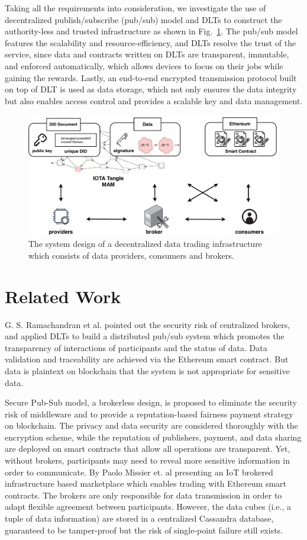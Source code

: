 \documentclass[10pt, conference, compsocconf]{IEEEtran}
\begin{document}
Taking all the requirements into consideration, we investigate the use of decentralized publish/subscribe (pub/sub) model and DLTs to construct the authority-less and trusted infrastructure as shown in Fig.~\ref{fig:system_design}. The pub/sub model features the scalability and resource-efficiency, and DLTs resolve the trust of the service, since data and contracts written on DLTs are transparent, immutable, and enforced automatically, which allows devices to focus on their jobs while gaining the rewards. Lastly, an end-to-end encrypted transmission protocol built on top of DLT is used as data storage, which not only ensures the data integrity but also enables access control and provides a scalable key and data management.

\begin{figure}[!t]
    \centering
    \includegraphics[width=3.in]{system_design}
    \caption{The system design of a decentralized data trading infrastructure which consists of data providers, consumers and brokers.}
    \label{fig:system_design}
\end{figure}

\section{Related Work}
\label{section:relatedWork}
G. S. Ramachandran et al.\cite{trinity} pointed out the security risk of centralized brokers, and applied DLTs to build a distributed pub/sub system which promotes the transparency of interactions of participants and the status of data. Data validation and traceability are achieved via the Ethereum smart contract. But data is plaintext on blockchain that the system is not appropriate for sensitive data.

Secure Pub-Sub model\cite{SPS}, a brokerless design, is proposed to eliminate the security risk of middleware and to provide a reputation-based fairness payment strategy on blockchain.
The privacy and data security are considered thoroughly with the encryption scheme, while the reputation of publishers, payment, and data sharing are deployed on smart contracts that allow all operations are transparent. Yet, without brokers, participants may need to reveal more sensitive information in order to communicate. By Paolo Missier et. al\cite{MindMyValue} presenting an IoT brokered infrastructure based marketplace which enables trading with Ethereum smart contracts. The brokers are only responsible for data transmission in order to adapt flexible agreement between participants. However, the data cubes (i.e., a tuple of data information) are stored in a centralized Cassandra database, guaranteed to be tamper-proof but the risk of single-point failure still exists.
\end{document}

